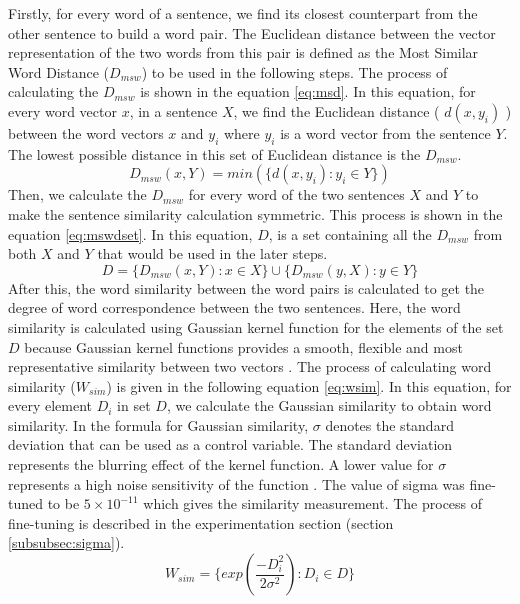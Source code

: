 Firstly, for every word of a sentence, we find its closest counterpart from the other sentence to build a word pair. The Euclidean distance between the vector representation of the two words from this pair is defined as the Most Similar Word Distance ($D_{msw}$) to be used in the following steps. The process of calculating the $D_{msw}$ is shown in the equation \ref{eq:msd}. In this equation, for every word vector $x$, in a sentence $X$, we find the Euclidean distance ( $d(x,y_i)$ ) between the word vectors $x$ and $y_i$ where $y_i$ is a word vector from the sentence $Y$. The lowest possible distance in this set of Euclidean distance is the $D_{msw}$. 
\begin{equation}\label{eq:msd}
    D_{msw}(x,Y) = min(\{d(x,y_i) : y_i \in Y \})
\end{equation}
Then, we calculate the $D_{msw}$ for every word of the two sentences $X$ and $Y$ to make the sentence similarity calculation symmetric. This process is shown in the equation \ref{eq:mswdset}. In this equation, $D$, is a set containing all the $D_{msw}$ from both $X$ and $Y$ that would be used in the later steps.
\begin{equation}
    D = \{D_{msw}(x,Y) : x \in X\} \cup \{D_{msw}(y,X) : y \in Y\}
    \label{eq:mswdset}
\end{equation}
After this, the word similarity between the word pairs is calculated to get the degree of word correspondence between the two sentences. Here, the word similarity is calculated using Gaussian kernel function for the elements of the set $D$ because Gaussian kernel functions provides a smooth, flexible and most representative similarity between two vectors \cite{babud-1986-gaussian}. The process of calculating word similarity ($W_{sim}$) is given in the following equation \ref{eq:wsim}. In this equation, for every element $D_i$ in set $D$, we calculate the Gaussian similarity to obtain word similarity. In the formula for Gaussian similarity, $\sigma$ denotes the standard deviation that can be used as a control variable. The standard deviation represents the blurring effect of the kernel function. A lower value for $\sigma$ represents a high noise sensitivity of the function \cite{babud-1986-gaussian}. The value of sigma was fine-tuned to be $5\times10^{-11}$ which gives the similarity measurement. The process of fine-tuning is described in the experimentation section (section \ref{subsubsec:sigma}). 
\begin{equation}\label{eq:wsim}
    W_{sim} = \{ exp\left(\frac{-D_i^2}{2\sigma^2}\right) : D_i \in D\}
\end{equation}
